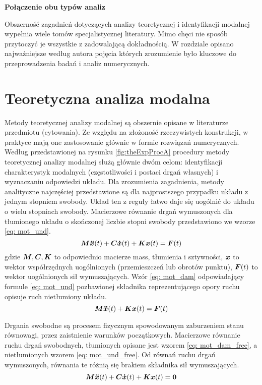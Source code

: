 \textbf{Połączenie obu typów analiz}

Obszerność zagadnień dotyczących analizy teoretycznej i identyfikacji modalnej wypełnia wiele tomów specjalistycznej literatury. Mimo chęci nie sposób przytoczyć je wszystkie z zadowalającą dokładnością. W rozdziale opisano najważniejsze według autora pojęcia których zrozumienie było kluczowe do  przeprowadzenia badań i analiz numerycznych.

\section{Teoretyczna analiza modalna}
\label{section: eigen}
Metody teoretycznej analizy modalnej są obszernie opisane w literaturze przedmiotu (cytowania). Ze względu na złożoność rzeczywistych konstrukcji, w praktyce mają one zastosowanie głównie w formie rozwiązań numerycznych.  Według przedstawionej na rysunku \ref{fig:theExpProcA} procedury metody teoretycznej analizy modalnej służą głównie dwóm celom: identyfikacji charakterystyk modalnych (częstotliwości i postaci drgań własnych) i wyznaczaniu odpowiedzi układu. Dla zrozumienia zagadnienia, metody analityczne najczęściej przedstawione są dla najprostszego przypadku układu z jednym stopniem swobody. Układ ten z reguły łatwo daje się uogólnić do układu o wielu stopniach swobody. Macierzowe równanie drgań wymuszonych dla tłumionego układu o skończonej liczbie stopni swobody przedstawiono we wzorze \ref{eq: mot_und}. 
\begin{equation} \label{eq: mot_und}
\bm{M} \bm{\ddot{x}}(t) +\bm{C} \bm{\dot{x}}(t)+ \bm{Kx}(t) = \bm{F}(t)
\end{equation}
gdzie $\bm{M},\bm{C},\bm{K}$ to odpowiednio macierze mass, tłumienia i sztywności, $\bm{x}$ to wektor współrzędnych uogólnionych (przemieszczeń lub obrotów punktu), $\bm{F}(t)$ to wektor uogólnionych sił wymuszających. Wzór \ref{eq: mot_dam} odpowiadający formule \ref{eq: mot_und} pozbawionej składnika reprezentującego opory ruchu opisuje ruch nietłumiony układu. 
\begin{equation} \label{eq: mot_dam}
\bm{M} \bm{\ddot{x}}(t) +\bm{Kx}(t) = \bm{F}(t)
\end{equation}

Drgania swobodne są procesem fizycznym spowodowanym zaburzeniem stanu równowagi, przez zaistnienie warunków początkowych. Macierzowe równanie ruchu drgań swobodnych, tłumionych opisane jest wzorem \ref{eq: mot_dam_free}, a nietłumionych wzorem \ref{eq: mot_und_free}. Od równań ruchu drgań wymuszonych, równania te różnią się brakiem składnika sił wymuszających.
\begin{equation} \label{eq: mot_dam_free}
\bm{M} \bm{\ddot{x}}(t) +\bm{C} \bm{\dot{x}}(t)+ \bm{Kx}(t) = \bm{0}
\end{equation}

